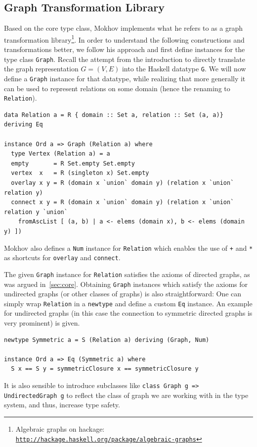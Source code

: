 \documentclass{article}
\newcommand{\hs}{\texttt}
\begin{document}
\subsection{Graph Transformation Library}\label{sec:trafo}
Based on the core type class, Mokhov implements what he refers to as a graph
transformation library\footnote{Algebraic graphs on hackage:
  \texttt{\href{http://hackage.haskell.org/package/algebraic-graphs}{http://hackage.haskell.org/package/algebraic-graphs}}}.
In order to understand the following constructions and transformations better,
we follow his approach and first define instances for the type class
\hs{Graph}. Recall the attempt from the introduction to directly translate the
graph representation $G=(V,E)$ into the Haskell datatype \hs{G}. We will now
define a \hs{Graph} instance for that datatype, while realizing that more
generally it can be used to represent relations on some domain (hence the renaming
to \hs{Relation}).
\begin{verbatim}
data Relation a = R { domain :: Set a, relation :: Set (a, a)} deriving Eq

instance Ord a => Graph (Relation a) where
  type Vertex (Relation a) = a
  empty       = R Set.empty Set.empty
  vertex  x   = R (singleton x) Set.empty
  overlay x y = R (domain x `union` domain y) (relation x `union` relation y)
  connect x y = R (domain x `union` domain y) (relation x `union` relation y `union`
    fromAscList [ (a, b) | a <- elems (domain x), b <- elems (domain y) ])
\end{verbatim}
Mokhov also defines a \hs{Num} instance for \hs{Relation} which enables the use
of \hs{+} and \hs{*} as shortcuts for \hs{overlay} and \hs{connect}.

The given \hs{Graph} instance for \hs{Relation} satisfies the axioms of directed
graphs, as was argued in~\autoref{sec:core}. Obtaining \hs{Graph} instances
which satisfy the axioms for undirected graphs (or other classes of graphs) is
also straightforward: One can simply wrap \hs{Relation} in a \hs{newtype} and
define a custom \hs{Eq} instance. An example for undirected graphs (in this case
the connection to symmetric directed graphs is very prominent) is given.
\begin{verbatim}
newtype Symmetric a = S (Relation a) deriving (Graph, Num)

instance Ord a => Eq (Symmetric a) where
  S x == S y = symmetricClosure x == symmetricClosure y
\end{verbatim}
It is also sensible to introduce subclasses like \hs{class Graph g => UndirectedGraph g}
to reflect the class of graph we are working with in the type system, and thus,
increase type safety.
\end{document}
